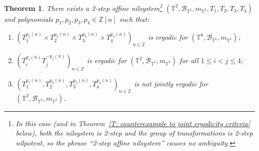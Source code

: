 \documentclass[11pt]{amsart}
\newtheorem{theorem}[lemma]{Theorem}
\theoremstyle{definition}
\newcommand{\T}{{\mathbb T}}
\newcommand{\Z}{{\mathbb Z}}
\newcommand{\CB}{{\mathcal B}}
\newcommand{\CX}{{\mathcal X}}
\newcommand{\1}{{\mathbf{1}}}
\begin{document}
\begin{theorem}\label{T: counterexample to joint ergodicity conjecture}
    There exists a 2-step affine nilsystem\footnote{In this case (and in Theorem~\ref{T: counterexample to joint ergodicity criteria} below), both the nilsystem is 2-step and the group of transformations is 2-step nilpotent, so the phrase ``2-step affine nilsystem'' causes no ambiguity.}
    $(\T^2, \CB_{\T^2}, m_{\T^2}, T_1, T_2, T_3, T_4)$ and polynomials $p_1, p_2, p_3, p_4\in\Z[n]$ such that:
        \begin{enumerate}
        \item $(T_1^{p_1(n)}\times T_2^{p_2(n)}\times T_3^{p_3(n)} \times T_4^{p_4(n)})_{n\in\Z}$ is ergodic for $(\T^8, \CB_{\T^8}, m_{\T^8})$;
        \item $(T_i^{p_i(n)} T_j^{-p_j(n)})_{n\in\Z}$ is ergodic for $(\T^2, \CB_{\T^2}, m_{\T^2})$ for all $1\leq i < j\leq 4$;
        \item $(T_1^{p_1(n)}, T_2^{p_2(n)}, T_3^{p_3(n)}, T_4^{p_4(n)})_{n\in\Z}$ is \emph{not} jointly ergodic for $(\T^2, \CB_{\T^2}, m_{\T^2})$.
    \end{enumerate}
\end{theorem}
\end{document}
